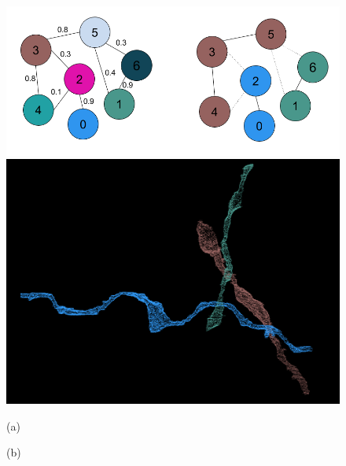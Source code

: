 \documentclass[10pt,twocolumn,letterpaper]{article}
\begin{document}
\begin{figure}[t]
\begin{minipage}{\textwidth}
\begin{minipage}{0.2\textwidth}
		\end{minipage}
		\begin{minipage}{0.3\textwidth}
			\includegraphics[width=\linewidth]{figures/schema/multicut-graph.png}
		\end{minipage}
		\begin{minipage}{0.2\textwidth}
			\includegraphics[width=\linewidth]{figures/schema/post-multicut.png}
		\end{minipage}
		\begin{minipage}{0.221\textwidth}
			\begin{center}
				(a)
			\end{center}
		\end{minipage}
		\begin{minipage}{0.221\textwidth}
			\begin{center}
				(b)
			\end{center}
		\end{minipage}
		\begin{minipage}{0.160\textwidth}
			\begin{center}

\end{center}
\end{minipage}
\end{minipage}
\end{figure}
\end{document}

